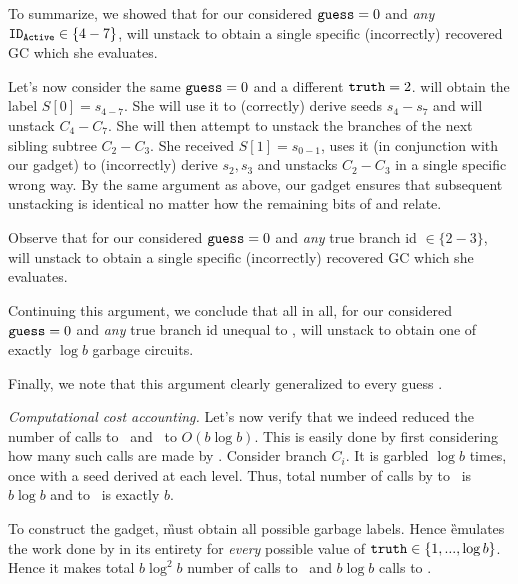 To summarize, we showed that for our considered $\mathtt{guess}=0$ and {\em any}  $\mathtt{ID_{Active}} \in \{4-7\}$, \E will unstack to obtain a single specific (incorrectly) recovered GC which she evaluates.

Let's now consider the same $\mathtt{guess}=0$ and a different $\mathtt{truth} = 2$.  \E will obtain the label $S[0]=s_{4-7}$.  She will use it to (correctly) derive seeds $s_4-s_7$ and will unstack $C_4-C_7$.  She will then attempt to unstack the branches of the next sibling subtree $C_2-C_3$.  She received  $S[1] = s_{0-1}$, uses it (in conjunction with our gadget) to (incorrectly) derive $s_2,s_3$ and unstacks $C_2-C_3$ in a single specific wrong way. By the same argument as above, our gadget ensures that subsequent unstacking is identical  no matter how the remaining bits of \truth and \guess relate.

Observe that for our considered $\mathtt{guess}=0$ and {\em any} true branch id $\in \{2-3\}$, \E will unstack to obtain a single specific (incorrectly) recovered GC which she evaluates.

Continuing this argument, we conclude that all in all, for our considered $\mathtt{guess}=0$ and {\em any} true branch id unequal to \guess, \E will unstack to obtain one of exactly $\log b$ garbage circuits.


Finally, we note  that this argument clearly generalized to every guess \guess.

{\em Computational cost accounting.} Let's now verify that we indeed reduced the number of calls to \Gb\ and \Ev\ to $O(b \log b)$.  This is easily done by first considering how many such calls are made by \E.  
Consider branch $C_i$.  It is garbled $\log b$ times, once with a seed derived at each level.  Thus, total number of calls by \E to \Gb\ is $b \log b$ and to \Ev\ is exactly $b$.  

To construct the gadget, \G must obtain all possible garbage labels.  Hence \G emulates the work done by \E in its entirety  for {\em every} possible value of $\mathtt{truth}\in\{1,...,\log b\}$.  Hence it makes total  $b \log^2 b$ number of calls to \Gb\ and $b \log b$ calls to  \Ev.  




















